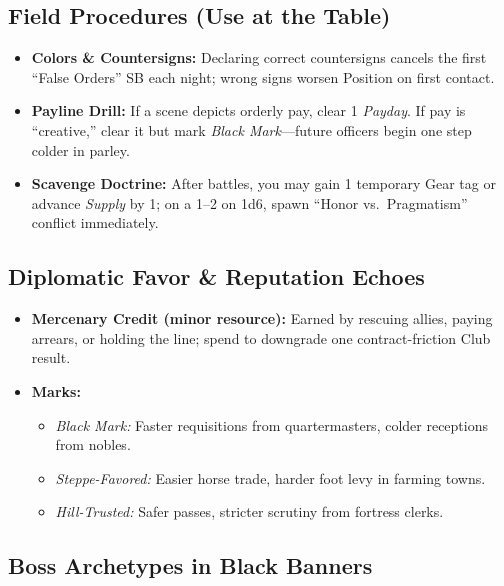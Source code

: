 \subsection*{Field Procedures (Use at the Table)}
\begin{itemize}
  \item \textbf{Colors \& Countersigns:} Declaring correct countersigns cancels the first “False Orders” SB each night; wrong signs worsen Position on first contact.
  \item \textbf{Payline Drill:} If a scene depicts orderly pay, clear 1 \emph{Payday}. If pay is “creative,” clear it but mark \emph{Black Mark}—future officers begin one step colder in parley.
  \item \textbf{Scavenge Doctrine:} After battles, you may gain 1 temporary Gear tag or advance \emph{Supply} by 1; on a 1–2 on 1d6, spawn “Honor vs.\ Pragmatism” conflict immediately.
\end{itemize}

\subsection*{Diplomatic Favor \& Reputation Echoes}
\begin{itemize}
  \item \textbf{Mercenary Credit (minor resource):} Earned by rescuing allies, paying arrears, or holding the line; spend to downgrade one contract-friction Club result.
  \item \textbf{Marks:}
    \begin{itemize}
      \item \emph{Black Mark:} Faster requisitions from quartermasters, colder receptions from nobles.
      \item \emph{Steppe-Favored:} Easier horse trade, harder foot levy in farming towns.
      \item \emph{Hill-Trusted:} Safer passes, stricter scrutiny from fortress clerks.
    \end{itemize}
\end{itemize}

\subsection*{Boss Archetypes in Black Banners}
\label{sec:black-banners-bosses}

